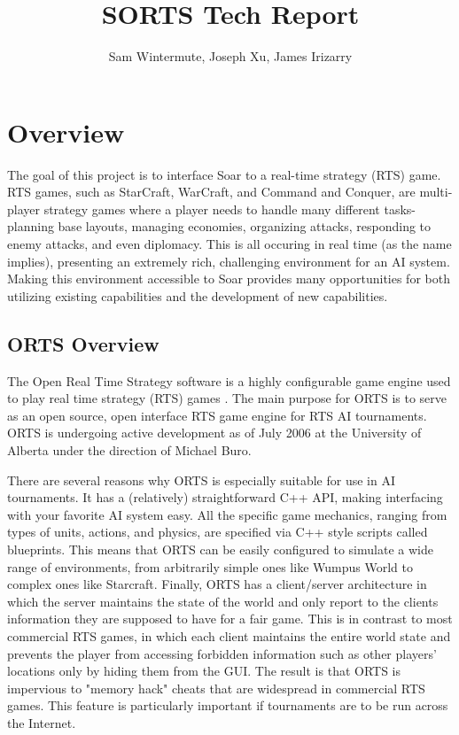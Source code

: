 \documentclass{article}
\title{SORTS Tech Report}
\author{Sam Wintermute, Joseph Xu, James Irizarry}
\begin{document}
\maketitle

\section{Overview}

The goal of this project is to interface Soar to a real-time strategy (RTS) game. RTS games, such as StarCraft, WarCraft, and Command and Conquer, are multi-player strategy games where a player needs to handle many different tasks- planning base layouts, managing economies, organizing attacks, responding to enemy attacks, and even diplomacy. This is all occuring in real time (as the name implies), presenting an extremely rich, challenging environment for an AI system. Making this environment accessible to Soar provides many opportunities for both utilizing existing capabilities and the development of new capabilities.

\subsection{ORTS Overview}

The Open Real Time Strategy software is a highly configurable game
engine used to play real time strategy (RTS) games \cite{ORTS}. The main
purpose for ORTS is to serve as an open source, open interface RTS game
engine for RTS AI tournaments. ORTS is undergoing active development as
of July 2006 at the University of Alberta under the direction of Michael
Buro.

There are several reasons why ORTS is especially suitable for use in
AI tournaments. It has a (relatively) straightforward C++ API, making
interfacing with your favorite AI system easy. All the specific game
mechanics, ranging from types of units, actions, and physics, are
specified via C++ style scripts called blueprints. This means that ORTS
can be easily configured to simulate a wide range of environments,
from arbitrarily simple ones like Wumpus World to complex ones like
Starcraft. Finally, ORTS has a client/server architecture in which
the server maintains the state of the world and only report to the
clients information they are supposed to have for a fair game. This
is in contrast to most commercial RTS games, in which each client
maintains the entire world state and prevents the player from accessing
forbidden information such as other players' locations only by hiding
them from the GUI. The result is that ORTS is impervious to "memory
hack" cheats that are widespread in commercial RTS games. This feature
is particularly important if tournaments are to be run across the
Internet.
\end{document}
